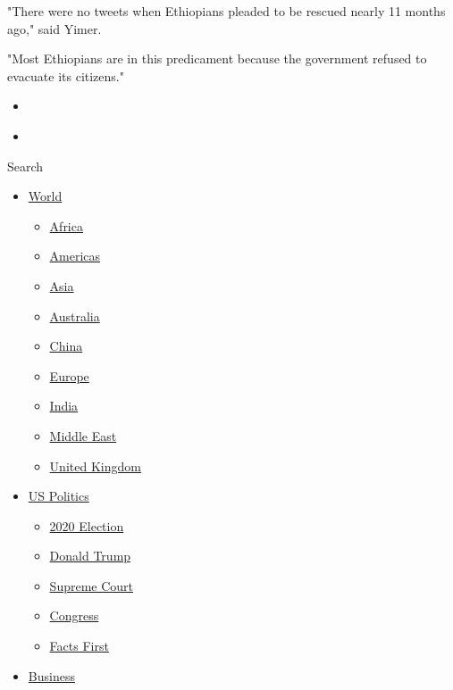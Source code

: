 "There were no tweets when Ethiopians pleaded to be rescued nearly 11
months ago," said Yimer.

"Most Ethiopians are in this predicament because the government refused
to evacuate its citizens."

\begin{itemize}
\item
\end{itemize}

\begin{itemize}
\item
\end{itemize}

Search

\begin{itemize}
\tightlist
\item
  \href{/world}{World}

  \begin{itemize}
  \tightlist
  \item
    \href{/africa}{Africa}
  \item
    \href{/americas}{Americas}
  \item
    \href{/asia}{Asia}
  \item
    \href{/australia}{Australia}
  \item
    \href{/china}{China}
  \item
    \href{/europe}{Europe}
  \item
    \href{/india}{India}
  \item
    \href{/middle-east}{Middle East}
  \item
    \href{/uk}{United Kingdom}
  \end{itemize}
\item
  \href{/politics}{US Politics}

  \begin{itemize}
  \tightlist
  \item
    \href{/election/2020}{2020 Election}
  \item
    \href{/specials/politics/president-donald-trump-45}{Donald Trump}
  \item
    \href{/specials/politics/supreme-court-nine}{Supreme Court}
  \item
    \href{/specials/politics/congress}{Congress}
  \item
    \href{/specials/politics/fact-check-politics}{Facts First}
  \end{itemize}
\item
  \href{/business}{Business}


\end{itemize}

